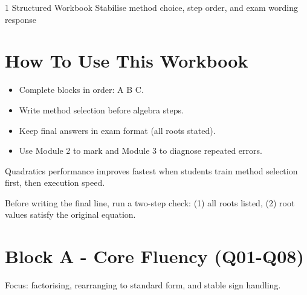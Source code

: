 \documentclass[11pt,a4paper]{article}
\begin{document}

\MasteryModuleCover
  {1}
  {Structured Workbook}
  {Stabilise method choice, step order, and exam wording response}

\section{How To Use This Workbook}
\begin{itemize}[leftmargin=1.3em]
  \item Complete blocks in order: A \textrightarrow{} B \textrightarrow{} C.
  \item Write method selection before algebra steps.
  \item Keep final answers in exam format (all roots stated).
  \item Use Module 2 to mark and Module 3 to diagnose repeated errors.
\end{itemize}

\begin{keyconceptbox}
Quadratics performance improves fastest when students train method selection first, then execution speed.
\end{keyconceptbox}

\begin{examtipbox}
Before writing the final line, run a two-step check: (1) all roots listed, (2) root values satisfy the original equation.
\end{examtipbox}

\section{Block A - Core Fluency (Q01-Q08)}
\textcolor{MMuted}{Focus: factorising, rearranging to standard form, and stable sign handling.}
\end{document}
